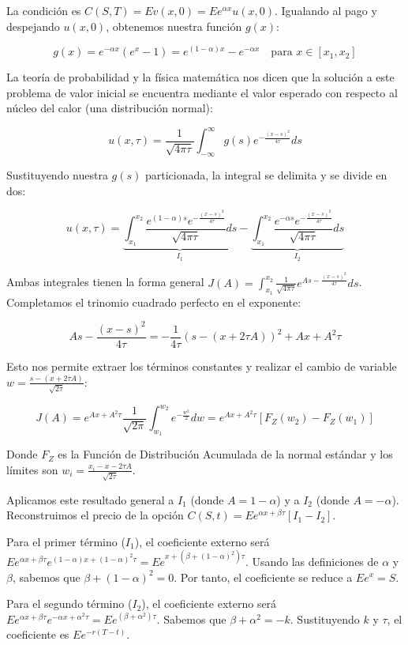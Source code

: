 \documentclass[12pt, a4paper]{article}
\begin{document}
La condición es $C(S,T) = E v(x, 0) = E e^{\alpha x} u(x, 0)$. Igualando al pago y despejando $u(x,0)$, obtenemos nuestra función $g(x)$:

\[ g(x) = e^{-\alpha x}(e^x - 1) = e^{(1-\alpha)x} - e^{-\alpha x} \quad \text{para } x \in [x_1, x_2] \]

La teoría de probabilidad y la física matemática nos dicen que la solución a este problema de valor inicial se encuentra mediante el valor esperado con respecto al núcleo del calor (una distribución normal):

\[ u(x, \tau) = \frac{1}{\sqrt{4\pi\tau}} \int_{-\infty}^{\infty} g(s) e^{-\frac{(x-s)^2}{4\tau}} ds \]

Sustituyendo nuestra $g(s)$ particionada, la integral se delimita y se divide en dos:

\[ u(x, \tau) = \underbrace{\int_{x_1}^{x_2} \frac{e^{(1-\alpha)s} e^{-\frac{(x-s)^2}{4\tau}}}{\sqrt{4\pi\tau}} ds}_{I_1} - \underbrace{\int_{x_1}^{x_2} \frac{e^{-\alpha s} e^{-\frac{(x-s)^2}{4\tau}}}{\sqrt{4\pi\tau}} ds}_{I_2} \]

Ambas integrales tienen la forma general $J(A) = \int_{x_1}^{x_2} \frac{1}{\sqrt{4\pi\tau}} e^{As - \frac{(x-s)^2}{4\tau}} ds$. Completamos el trinomio cuadrado perfecto en el exponente:

\[ As - \frac{(x-s)^2}{4\tau} = -\frac{1}{4\tau} (s - (x + 2\tau A))^2 + Ax + A^2\tau \]

Esto nos permite extraer los términos constantes y realizar el cambio de variable $w = \frac{s - (x + 2\tau A)}{\sqrt{2\tau}}$:

\[ J(A) = e^{Ax + A^2\tau} \frac{1}{\sqrt{2\pi}} \int_{w_1}^{w_2} e^{-\frac{w^2}{2}} dw = e^{Ax + A^2\tau} \left[ F_Z(w_2) - F_Z(w_1) \right] \]

Donde $F_Z$ es la Función de Distribución Acumulada de la normal estándar y los límites son $w_i = \frac{x_i - x - 2\tau A}{\sqrt{2\tau}}$.

Aplicamos este resultado general a $I_1$ (donde $A = 1-\alpha$) y a $I_2$ (donde $A = -\alpha$). Reconstruimos el precio de la opción $C(S,t) = E e^{\alpha x + \beta \tau} [I_1 - I_2]$.

Para el primer término ($I_1$), el coeficiente externo será $E e^{\alpha x + \beta \tau} e^{(1-\alpha)x + (1-\alpha)^2\tau} = E e^{x + (\beta + (1-\alpha)^2)\tau}$. Usando las definiciones de $\alpha$ y $\beta$, sabemos que $\beta + (1-\alpha)^2 = 0$. Por tanto, el coeficiente se reduce a $E e^x = S$.

Para el segundo término ($I_2$), el coeficiente externo será $E e^{\alpha x + \beta \tau} e^{-\alpha x + \alpha^2\tau} = E e^{(\beta + \alpha^2)\tau}$. Sabemos que $\beta + \alpha^2 = -k$. Sustituyendo $k$ y $\tau$, el coeficiente es $E e^{-r(T-t)}$.
\end{document}
